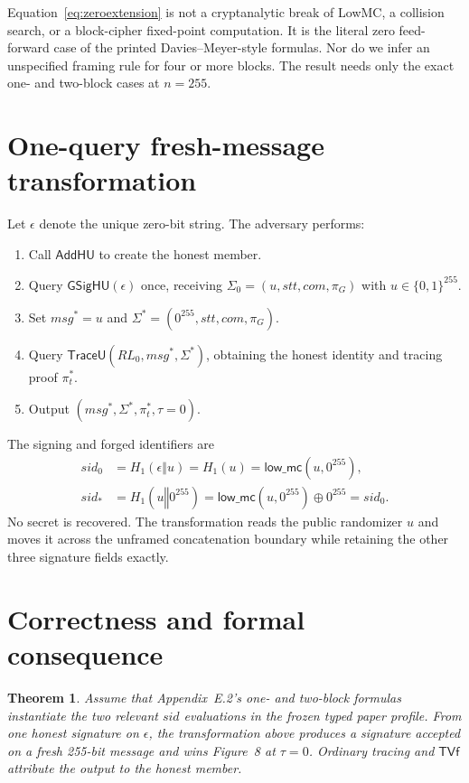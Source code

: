 \documentclass[10pt,a4paper]{article}
\newtheorem{theorem}{Theorem}
\newcommand{\bits}{\{0,1\}}
\newcommand{\Hone}{H_1}
\newcommand{\sid}{\mathit{sid}}
\newcommand{\stt}{\mathit{stt}}
\newcommand{\com}{\mathit{com}}
\newcommand{\msg}{\mathit{msg}}
\newcommand{\TVf}{\mathsf{TVf}}
\begin{document}
Equation~\eqref{eq:zeroextension} is not a cryptanalytic break of LowMC, a
collision search, or a block-cipher fixed-point computation. It is the literal
zero feed-forward case of the printed Davies--Meyer-style formulas. Nor do we
infer an unspecified framing rule for four or more blocks. The result needs
only the exact one- and two-block cases at $n=255$.

\section{One-query fresh-message transformation}

Let $\epsilon$ denote the unique zero-bit string. The adversary performs:
\begin{enumerate}
  \item Call $\mathsf{AddHU}$ to create the honest member.
  \item Query $\mathsf{GSigHU}(\epsilon)$ once, receiving
        $\Sigma_0=(u,\stt,\com,\pi_G)$ with $u\in\bits^{255}$.
  \item Set $\msg^*=u$ and
        $\Sigma^*=(0^{255},\stt,\com,\pi_G)$.
  \item Query $\mathsf{TraceU}(RL_0,\msg^*,\Sigma^*)$, obtaining the honest
        identity and tracing proof $\pi_t^*$.
  \item Output $(\msg^*,\Sigma^*,\pi_t^*,\tau=0)$.
\end{enumerate}
The signing and forged identifiers are
\begin{align}
\sid_0
 &=\Hone(\epsilon\mathbin\Vert u)
   =\Hone(u)
   =\mathsf{low\_mc}(u,0^{255}),\label{eq:sid0}\\
\sid_*
 &=\Hone(u\mathbin\Vert0^{255})
   =\mathsf{low\_mc}(u,0^{255})\oplus0^{255}
   =\sid_0.\label{eq:sidstar}
\end{align}
No secret is recovered. The transformation reads the public randomizer $u$
and moves it across the unframed concatenation boundary while retaining the
other three signature fields exactly.

\section{Correctness and formal consequence}

\begin{theorem}\label{thm:forgery}
Assume that Appendix~E.2's one- and two-block formulas instantiate the two
relevant $\sid$ evaluations in the frozen typed paper profile. From one honest
signature on $\epsilon$, the transformation above produces a signature
accepted on a fresh 255-bit message and wins Figure~8 at $\tau=0$. Ordinary
tracing and $\TVf$ attribute the output to the honest member.
\end{theorem}
\end{document}
